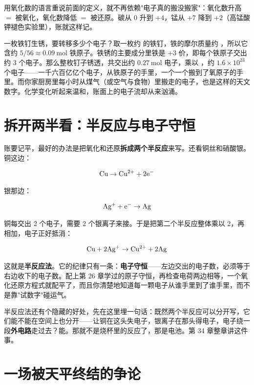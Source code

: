 用氧化数的语言重说前面的定义，就不再依赖"电子真的搬没搬家"：氧化数升高 $=$ 被氧化，氧化数降低 $=$ 被还原。碳从 0 升到 $+4$，锰从 $+7$ 降到 $+2$（高锰酸钾褪色实验里），账就这样记。

\begin{qiaoliang}
一枚铁钉生锈，要转移多少个电子？取一枚约  的铁钉，铁的摩尔质量约 ，所以它含约 $5/56 \approx 0.09\ \mathrm{mol}$ 铁原子。铁锈的主要成分里铁是 $+3$ 价，即每个铁原子交出约 3 个电子。那么整枚钉子锈透，共交出约 $0.27\ \mathrm{mol}$ 电子，乘以 ，约 $1.6\times 10^{23}$ 个电子——一千六百亿亿个电子，从铁原子的手里，一个一个搬到了氧原子的手里。而你家厨房里每小时从煤气（或空气与食物）里搬走的电子，也是这样的天文数字。化学变化听起来温和，账面上的电子流却从来汹涌。
\end{qiaoliang}

\section{拆开两半看：半反应与电子守恒}

账要记平，最好的办法是把氧化和还原\textbf{拆成两个半反应}来写。还看铜丝和硝酸银。铜这边：

\[\mathrm{Cu} \rightarrow \mathrm{Cu^{2+}} + \mathrm{2e^-}\]

银那边：

\[\mathrm{Ag^+} + \mathrm{e^-} \rightarrow \mathrm{Ag}\]

铜每交出 2 个电子，需要 2 个银离子来接。于是把第二个半反应整体乘以 2，再相加，电子正好抵消：

\[\mathrm{Cu} + \mathrm{2Ag^+} \rightarrow \mathrm{Cu^{2+}} + \mathrm{2Ag}\]

这就是\textbf{半反应法}。它的纪律只有一条：\textbf{电子守恒}——左边交出的电子数，必须等于右边收下的电子数。配上第 26 章学过的原子守恒，再检查电荷两边相等，一个氧化还原方程式就配平了，而且你清楚地知道每一颗电子从谁手里到了谁手里，而不是靠"试数字"碰运气。

半反应法还有个隐藏的好处，先在这里埋一句话：既然两个半反应可以分开写，它们能不能在空间上也分开——让铜在这头失电子，银离子在那头得电子，电子绕一段\textbf{外电路}走过去？能。那就不是烧杯里的反应了，那是电池。第 34 章整章讲这件事。

\section{一场被天平终结的争论}

